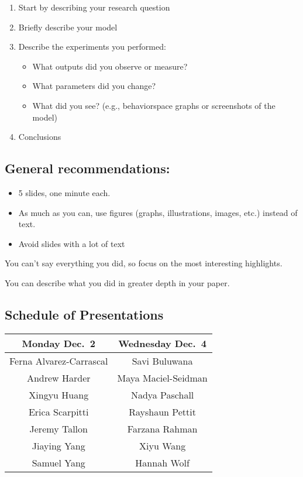 \documentclass[
]{article}
\providecommand{\tightlist}{%
  \setlength{\itemsep}{0pt}\setlength{\parskip}{0pt}}
\begin{document}
\begin{enumerate}
\tightlist
\item
  Start by describing your research question
\item
  Briefly describe your model
\item
  Describe the experiments you performed:

  \begin{itemize}
  \tightlist
  \item
    What outputs did you observe or measure?
  \item
    What parameters did you change?
  \item
    What did you see? (e.g., behaviorspace graphs or screenshots of the
    model)
  \end{itemize}
\item
  Conclusions
\end{enumerate}

\subsection{General recommendations:}\label{general-recommendations-1}

\begin{itemize}
\tightlist
\item
  5 slides, one minute each.
\item
  As much as you can, use figures (graphs, illustrations, images, etc.)
  instead of text.
\item
  Avoid slides with a lot of text
\end{itemize}

You can't say everything you did, so focus on the most interesting
highlights.

You can describe what you did in greater depth in your paper.

\subsection{Schedule of
Presentations}\label{schedule-of-presentations-1}

\begin{longtable}[]{@{}cc@{}}
\toprule\noalign{}
Monday Dec.~2 & Wednesday Dec.~4 \\
\midrule\noalign{}
\endhead
\bottomrule\noalign{}
\endlastfoot
Ferna Alvarez-Carrascal & Savi Buluwana \\
Andrew Harder & Maya Maciel-Seidman \\
Xingyu Huang & Nadya Paschall \\
Erica Scarpitti & Rayshaun Pettit \\
Jeremy Tallon & Farzana Rahman \\
Jiaying Yang & Xiyu Wang \\
Samuel Yang & Hannah Wolf \\
\end{longtable}
\end{document}
